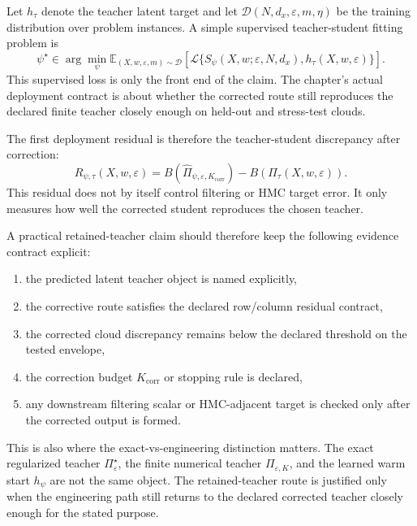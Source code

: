 Let \(h_\tau\) denote the teacher latent target and let
\(\mathcal D(N,d_x,\varepsilon,m,\eta)\) be the training distribution over
problem instances.  A simple supervised teacher-student fitting problem is
\begin{equation}
\label{eq:bf-learned-ot-training-objective}
  \psi^\star
  \in
  \arg\min_\psi
  \mathbb E_{(X,w,\varepsilon,m)\sim\mathcal D}
  \left[
    \mathcal L\{S_\psi(X,w;\varepsilon,N,d_x),h_\tau(X,w,\varepsilon)
    \}
  \right].
\end{equation}
This supervised loss is only the front end of the claim.  The chapter’s actual
deployment contract is about whether the corrected route still reproduces the
declared finite teacher closely enough on held-out and stress-test clouds.

The first deployment residual is therefore the teacher-student discrepancy after
correction:
\begin{equation}
\label{eq:bf-learned-ot-residual}
  R_{\psi,\tau}(X,w,\varepsilon)
  =
  B(\widehat\Pi_{\psi,\varepsilon,K_{\mathrm{corr}}})
  -
  B(\Pi_\tau(X,w,\varepsilon)).
\end{equation}
This residual does not by itself control filtering or HMC target error.  It only
measures how well the corrected student reproduces the chosen teacher.

A practical retained-teacher claim should therefore keep the following evidence
contract explicit:
\begin{enumerate}[label=(\arabic*)]
  \item the predicted latent teacher object is named explicitly,
  \item the corrective route satisfies the declared row/column residual contract,
  \item the corrected cloud discrepancy remains below the declared threshold on
  the tested envelope,
  \item the correction budget \(K_{\mathrm{corr}}\) or stopping rule is declared,
  \item any downstream filtering scalar or HMC-adjacent target is checked only
  after the corrected output is formed.
\end{enumerate}

This is also where the exact-vs-engineering distinction matters.  The exact
regularized teacher \(\Pi_\varepsilon^\star\), the finite numerical teacher
\(\Pi_{\varepsilon,K}\), and the learned warm start \(h_\psi\) are not the same
object.  The retained-teacher route is justified only when the engineering path
still returns to the declared corrected teacher closely enough for the stated
purpose.

